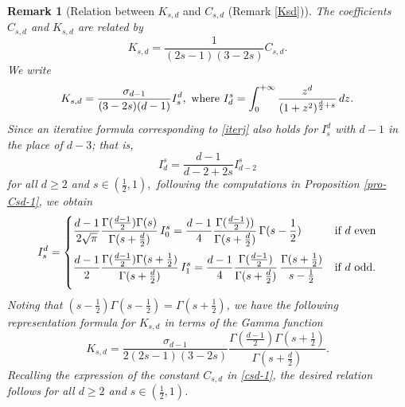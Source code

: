 \documentclass[11pt]{article}
\newtheorem{remark}[definition]{Remark}
\begin{document}
\begin{remark}[Relation between $K_{s,d}$ and $C_{s,d}$ (Remark \ref{Ksd})]\label{Ksd-1}\rm 
The coefficients $C_{s,d}$ and $K_{s,d}$ are related by $$
K_{s,d}=\frac{1}{(2s-1)(3-2s)}C_{s,d}.
$$
We write 
$$K_{s,d}=\frac{\sigma_{d-1}}{(3-2s)(d-1)}I_s^d,
\hbox{ where }
I_d^s=\int_{0}^{+\infty}\frac{z^d}{(1+z^2)^{\frac{d}{2}+s}}\, dz.$$ 
Since an iterative formula corresponding to \eqref{iterj} also holds for $I_s^d$ with $d-1$ in the place of $d-3$; that is, 
$$I^s_d=\frac{d-1}{d-2+2s}I^s_{d-2}$$
for all $d\geq 2$ and $s\in (\frac{1}{2},1),$ following the computations in Proposition \ref{pro-Csd-1}, we obtain 
$$I_s^d=
\begin{cases}
\vspace{2mm}
\displaystyle 
\frac{d-1}{2\sqrt{\pi}}
\frac{\Gamma(\frac{d-1}{2})
\Gamma(s)}{\Gamma(s+\frac{d}{2})}\, I^s_0 = \frac{d-1}{4}
\frac{\Gamma(\frac{d-1}{2}))
}{\Gamma(s+\frac{d}{2})}\, \Gamma(s-\frac{1}{2})& \hbox{\rm if $d$ even}\\
\vspace{2mm}
\displaystyle \frac{d-1}{2}\frac{\Gamma(\frac{d-1}{2})\Gamma(s+\frac{1}{2})}{\Gamma(s+\frac{d}{2})}\, I^s_1=\frac{d-1}{4}\frac{\Gamma(\frac{d-1}{2})}{\Gamma(s+\frac{d}{2})}\, \frac{\Gamma(s+\frac{1}{2})}{s-\frac{1}{2}}
& \hbox{\rm if $d$ odd.}
\end{cases}$$
Noting that $(s-\frac{1}{2})\Gamma(s-\frac{1}{2})=\Gamma(s+\frac{1}{2})$, we have the following representation formula for $K_{s,d}$ in terms of the Gamma function 
$$K_{s,d}=\frac{\sigma_{d-1}}{2(2s-1)(3-2s)}\frac{\Gamma(\frac{d-1}{2})\Gamma(s+\frac{1}{2})}{\Gamma(s+\frac{d}{2})}.$$
Recalling the expression of the constant $C_{s,d}$ in \eqref{csd-1}, 
the desired relation 
follows for all $d\geq 2$ and $s\in(\frac{1}{2},1)$. 
 \end{remark}
\end{document}

